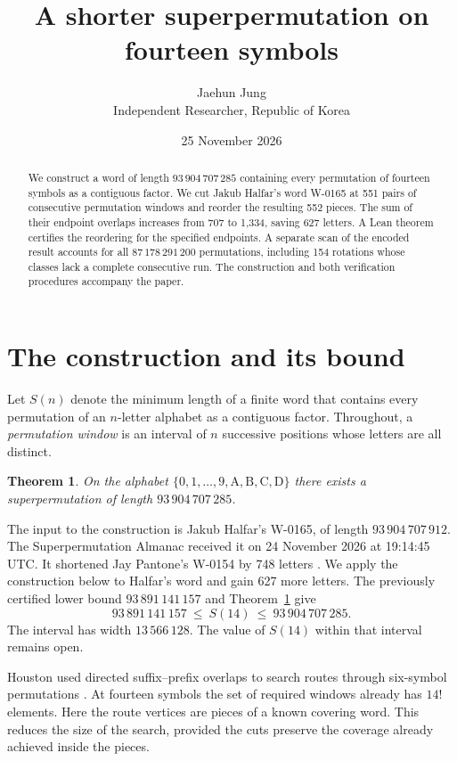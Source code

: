\documentclass[11pt]{article}
\title{A shorter superpermutation on fourteen symbols}
\author{Jaehun Jung\\[2pt]\small Independent Researcher, Republic of Korea}
\date{25 November 2026}
\newtheorem{theorem}{Theorem}
\begin{document}
\maketitle
\begin{abstract}
We construct a word of length \(93\,904\,707\,285\) containing every permutation of fourteen symbols as a contiguous factor. We cut Jakub Halfar's word W-0165 at 551 pairs of consecutive permutation windows and reorder the resulting 552 pieces. The sum of their endpoint overlaps increases from 707 to 1,334, saving 627 letters. A Lean theorem certifies the reordering for the specified endpoints. A separate scan of the encoded result accounts for all \(87\,178\,291\,200\) permutations, including 154 rotations whose classes lack a complete consecutive run. The construction and both verification procedures accompany the paper.
\end{abstract}

\section{The construction and its bound}
Let \(S(n)\) denote the minimum length of a finite word that contains every permutation of an \(n\)-letter alphabet as a contiguous factor. Throughout, a \emph{permutation window} is an interval of \(n\) successive positions whose letters are all distinct.

\begin{theorem}\label{main}
On the alphabet \(\{0,1,\ldots,9,\mathrm A,\mathrm B,\mathrm C,\mathrm D\}\) there exists a superpermutation of length \(93\,904\,707\,285\).
\end{theorem}

The input to the construction is Jakub Halfar's W-0165, of length \(93\,904\,707\,912\). The Superpermutation Almanac received it on 24 November 2026 at 19:14:45 UTC. It shortened Jay Pantone's W-0154 by 748 letters \cite{halfar,pantone}. We apply the construction below to Halfar's word and gain 627 more letters. The previously certified lower bound \(93\,891\,141\,157\) \cite{bound} and Theorem~\ref{main} give
\[
93\,891\,141\,157 \ \leq\ S(14)\ \leq\ 93\,904\,707\,285 .
\]
The interval has width \(13\,566\,128\). The value of \(S(14)\) within that interval remains open.

Houston used directed suffix--prefix overlaps to search routes through six-symbol permutations \cite{houston}. At fourteen symbols the set of required windows already has \(14!\) elements. Here the route vertices are pieces of a known covering word. This reduces the size of the search, provided the cuts preserve the coverage already achieved inside the pieces.
\end{document}
